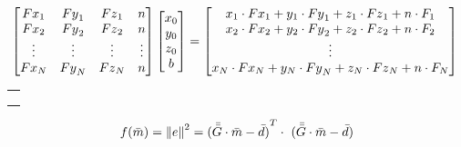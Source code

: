 \documentclass[manuscript,revised]{geophysics}
\begin{document}
\begin{equation} \label{eq:euler3}
\centering
\left[\begin{matrix}{Fx}_1&{Fy}_1&{Fz}_1&n\\{Fx}_2&{Fy}_2&{Fz}_2&n\\\vdots&\vdots&\vdots&\vdots\\{Fx}_N&{Fy}_N&{Fz}_N&n\\\end{matrix}\right]\left[\begin{matrix}x_0\\y_0\\z_0\\b\\\end{matrix}\right]=\left[\begin{matrix}x_1\cdot{Fx}_1+y_1 \cdot {Fy}_1+z_1 \cdot {Fz}_1+n\cdot F_1\\x_2\cdot{Fx}_2+y_2\cdot{Fy}_2+z_2\cdot{Fz}_2+n\cdot F_2\\\vdots\\x_N\cdot{Fx}_N+y_N\cdot{Fy}_N+z_N\cdot{Fz}_N+n\cdot F_N\\\end{matrix}\right]\ 
\end{equation}

\begin{tabular}{ l }
\noindent{Where: $Fx_i$, $Fy_i$ and $Fz_i$ represent, respectively, the gradients $\frac{\partial F}{\partial x}$, $\frac{\partial F}{\partial y}$ and $\frac{\partial F}{\partial z}$}   \\
\noindent{evaluated on the i-th observation point ($i=1,2, ..., N$). While $x_i$, $y_i$ and $z_i$}   \\
\noindent{represent the cartesian coordinates at the i-th observation point.}
\end{tabular}

\bigskip


\begin{equation} \label{eq:euler4}
\centering
f(\bar{m} ) = {\lVert e\lVert}^2 = {(\bar{\bar{G}} \cdot \bar{m}-\bar{d})}^T \cdot ~ (\bar{\bar{G}} \cdot \bar{m}-\bar{d})
\end{equation}

\end{document}
